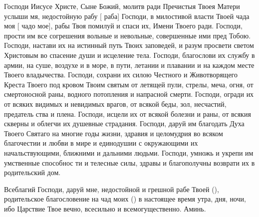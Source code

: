 \begin{mymulticols}
 

Господи Иисусе Христе, Сыне Божий, молитв ради Пречистыя Твоея Матери услыши мя, недостойную рабу [ раба] Господи, в милостивой власти Твоей чада моя [ чадо мое], рабы Твоя помилуй и спаси их, Имени Твоего ради. Господи, прости им все согрешения вольные и невольные, совершенные ими пред Тобою. Господи, настави их на истинный путь Твоих заповедей, и разум просвети светом Христовым во спасение души и исцеление тела. Господи, благослови их службу в армии, на суше, воздухе и в море, в пути, летании и плавании и на каждом месте Твоего владычества. Господи, сохрани их силою Честного и Животворящего Креста Твоего под кровом Твоим святым от летящей пули, стрелы, меча, огня, от смертоносной раны, водного потопления и напрасной смерти. Господи, огради их от всяких видимых и невидимых врагов, от всякой беды, зол, несчастий, предатель ства и плена. Господи, исцели их от всякой болезни и раны, от всякия скверны и облегчи их душевные страдания. Господи, даруй им благодать Духа Твоего Святаго на многие годы жизни, здравия и целомудрия во всяком благочестии и любви в мире и единодушии с окружающими их начальствующими, ближними и дальними людьми. Господи, умножь и укрепи им умственные способнос ти и телесные силы, здравы и благополучны возврати их в родительский дом. 

Всеблагий  Господи, даруй мне, недостойной и грешной рабе Твоей (), родительское благословение на чад моих () в настоящее время утра, дня, ночи, ибо Царствие Твое вечно, всесильно и всемогущественно. Аминь. 

\end{mymulticols}

\mychapterending

